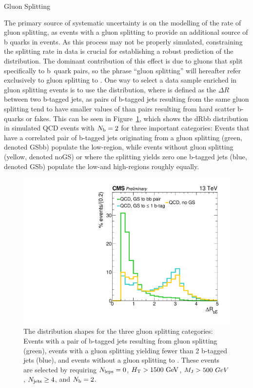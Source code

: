\begin{section}{Gluon Splitting}

The primary source of systematic uncertainty is on the modelling of the rate of gluon splitting, as events with a gluon splitting to \bbbar provide an additional source of b quarks in events.
As this process may not be properly simulated, constraining the splitting rate in data is crucial for establishing a robust prediction of the \Nb distribution.
The dominant contribution of this effect is due to gluons that split specifically to b~quark pairs, so the phrase ``gluon splitting'' will hereafter refer exclusively to gluon splitting to \bbbar.
One way to select a data sample enriched in gluon splitting events is to use the \dRbb distribution, where \dRbb is defined as the $\Delta R$ between two b-tagged jets, as pairs of b-tagged jets resulting from the same gluon splitting tend to have smaller values of \dRbb than pairs resulting from hard scatter b-quarks or fakes.
This can be seen in Figure~\ref{fig:dRbb_shapes}, which shows the dRbb distribution in simulated QCD events with $N_\mathrm{b} = 2$ for three important categories:
Events that have a correlated pair of b-tagged jets originating from a gluon splitting (green, denoted GSbb) populate the low-\dRbb region, while events without gluon splitting (yellow, denoted noGS) or where the splitting yields zero one b-tagged jets (blue, denoted GSb) populate the low-and high-\dRbb regions roughly equally.

\begin{figure}[tbp!]
\begin{center}
\includegraphics[angle=0,width=0.95\columnwidth]{fig/dRbb_shapes.pdf}
\end{center}
\caption{The \dRbb distribution shapes for the three gluon splitting categories: Events with a pair of b-tagged jets resulting from gluon splitting (green), events with a gluon splitting yielding fewer than 2 b-tagged jets (blue), and events without a gluon splitting to \bbbar. These events are selected by requiring $N_{\mathrm{leps}}=0$, $H_\mathrm{T} > 1500~\mathrm{Ge\kern -0.1em V}$, $M_\mathrm{J} > 500~GeV$, $N_{\mathrm{jets}} \geq 4$, and $N_\mathrm{b}=2$.}
\label{fig:dRbb_shapes}
\end{figure}


\end{section}
